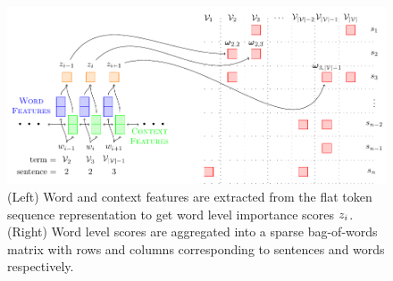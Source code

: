 \begin{figure}
 \begin{center}
  \includegraphics[scale=1.0]{dl_based_salience_models/figures/4_2_wimp_model.pdf}
 \end{center}
 \caption{(Left) Word and context features are extracted from the flat token
sequence representation to get word level importance scores 
$z_i$. (Right) Word level scores are aggregated into a sparse
bag-of-words matrix with rows and columns corresponding to sentences and 
words respectively.}
\end{figure}
